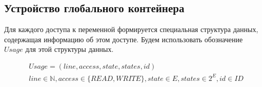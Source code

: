 %
%
%

\subsection{Устройство глобального контейнера} \label{subsect_impl_global_storage}
Для каждого доступа к переменной формируется специальная структура данных, содержащая информацию об этом доступе. 
Будем использовать обозначение $Usage$ для этой структуры данных.

\begin{align}
& Usage = (line, access, state, states, id) \nonumber \\ 
& line \in \mathbb{N}, access \in \{READ, WRITE\}, state \in E, states \in 2^E, id \in ID \nonumber
\end{align}

